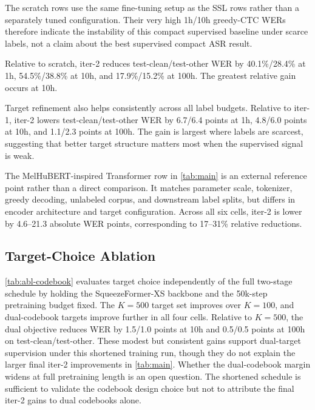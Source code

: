 \documentclass{article}
\begin{document}
The scratch rows use the same fine-tuning setup as the SSL rows
rather than a separately tuned configuration. Their very high
1h/10h greedy-CTC WERs therefore indicate the instability of this
compact supervised baseline under scarce labels, not a claim about
the best supervised compact ASR result.

Relative to scratch, iter-2 reduces test-clean/test-other WER by
40.1\%/28.4\% at 1h, 54.5\%/38.8\% at 10h, and 17.9\%/15.2\% at 100h.
The greatest relative gain occurs at 10h.

Target refinement also helps consistently across all label budgets.
Relative to iter-1, iter-2 lowers test-clean/test-other WER by
6.7/6.4 points at 1h, 4.8/6.0 points at 10h, and 1.1/2.3 points
at 100h. The gain is largest where labels are scarcest, suggesting
that better target structure matters most when the supervised signal
is weak.

The MelHuBERT-inspired Transformer row in \cref{tab:main} is an
external reference point rather than a direct comparison. It matches
parameter scale, tokenizer, greedy decoding, unlabeled corpus, and
downstream label splits, but differs in encoder architecture and
target configuration. Across all six cells, iter-2 is lower by
4.6--21.3 absolute WER points, corresponding to 17--31\% relative
reductions.

\subsection{Target-Choice Ablation}
\cref{tab:abl-codebook} evaluates target choice independently of the
full two-stage schedule by holding the SqueezeFormer-XS backbone and
the 50k-step pretraining budget fixed. The $K{=}500$ target set
improves over $K{=}100$, and dual-codebook targets improve further
in all four cells. Relative to $K{=}500$, the dual objective reduces
WER by 1.5/1.0 points at 10h and 0.5/0.5 points at 100h on
test-clean/test-other. These modest but consistent gains support
dual-target supervision under this shortened training run, though
they do not explain the larger final iter-2 improvements in
\cref{tab:main}. Whether the dual-codebook margin widens at full
pretraining length is an open question. The shortened schedule is
sufficient to validate the codebook design choice but not to
attribute the final iter-2 gains to dual codebooks alone.
\end{document}
